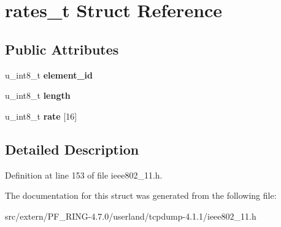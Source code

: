 \hypertarget{structrates__t}{
\section{rates\_\-t Struct Reference}
\label{structrates__t}
}
\subsection*{Public Attributes}
\begin{DoxyCompactItemize}
\item 
\hypertarget{structrates__t_a3c24fa5ba65040b6919192cfff0e0c2d}{
u\_\-int8\_\-t {\bfseries element\_\-id}}
\label{structrates__t_a3c24fa5ba65040b6919192cfff0e0c2d}

\item 
\hypertarget{structrates__t_ab8102ab673e4ad94325bdfd28aa795b7}{
u\_\-int8\_\-t {\bfseries length}}
\label{structrates__t_ab8102ab673e4ad94325bdfd28aa795b7}

\item 
\hypertarget{structrates__t_aa4dafd26901eac035ef9ec29a05beaa0}{
u\_\-int8\_\-t {\bfseries rate} \mbox{[}16\mbox{]}}
\label{structrates__t_aa4dafd26901eac035ef9ec29a05beaa0}

\end{DoxyCompactItemize}


\subsection{Detailed Description}


Definition at line 153 of file ieee802\_\-11.h.



The documentation for this struct was generated from the following file:\begin{DoxyCompactItemize}
\item 
src/extern/PF\_\-RING-\/4.7.0/userland/tcpdump-\/4.1.1/ieee802\_\-11.h\end{DoxyCompactItemize}
